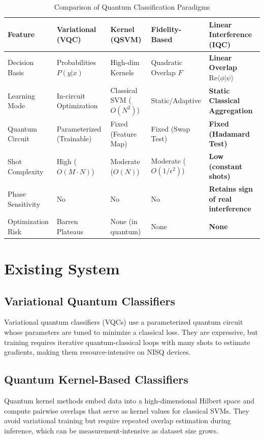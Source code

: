 \documentclass[conference]{IEEEtran}
\begin{document}
\begin{table}[t]
\centering
\caption{Comparison of Quantum Classification Paradigms}
\label{tab:comparison}
\begin{tabular}{@{}lllll@{}}
\toprule
Feature & Variational (VQC) & Kernel (QSVM) & Fidelity-Based & \textbf{Linear Interference (IQC)} \\ \midrule
Decision Basis & Probabilities $P(y|x)$ & High-dim Kernels & Quadratic Overlap $F$ & \textbf{Linear Overlap $\mathrm{Re}\langle \phi|\psi \rangle$} \\
Learning Mode & In-circuit Optimization & Classical SVM ($O(N^2)$) & Static/Adaptive & \textbf{Static Classical Aggregation} \\
Quantum Circuit & Parameterized (Trainable) & Fixed (Feature Map) & Fixed (Swap Test) & \textbf{Fixed (Hadamard Test)} \\
Shot Complexity & High ($O(M \cdot N)$) & Moderate ($O(N)$) & Moderate ($O(1/\epsilon^2)$) & \textbf{Low (constant shots)} \\
Phase Sensitivity & No & No & No & \textbf{Retains sign of real interference} \\
Optimization Risk & Barren Plateaus & None (in quantum) & None & \textbf{None} \\ \bottomrule
\end{tabular}
\end{table}

\section{Existing System}

\subsection{Variational Quantum Classifiers}
Variational quantum classifiers (VQCs) use a parameterized quantum circuit whose parameters are tuned to minimize a classical loss. They are expressive, but training requires iterative quantum-classical loops with many shots to estimate gradients, making them resource-intensive on NISQ devices.

\subsection{Quantum Kernel-Based Classifiers}
Quantum kernel methods embed data into a high-dimensional Hilbert space and compute pairwise overlaps that serve as kernel values for classical SVMs. They avoid variational training but require repeated overlap estimation during inference, which can be measurement-intensive as dataset size grows.
\end{document}
